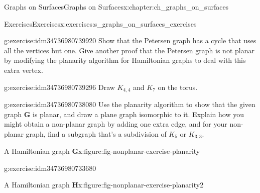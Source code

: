 \documentclass[oneside,10pt,]{book}
\numberwithin{equation}{section}
\newcommand{\bfG}{\mathbf{G}}
\newcommand{\bfH}{\mathbf{H}}
\begin{document}
\begin{chapterptx}{Graphs on Surfaces}{}{Graphs on Surfaces}{}{}{x:chapter:ch_graphs_on_surfaces}
\typeout{************************************************}
%
\begin{exercises-section}{Exercises}{}{Exercises}{}{}{x:exercises:s_graphs_on_surfaces_exercises}
\begin{divisionexercise}{1}{}{}{g:exercise:idm34736980739920}%
Show that the Petersen graph has a cycle that uses all the vertices but one.  Give another proof that the Petersen graph is not planar by modifying the planarity algorithm for Hamiltonian graphs to deal with this extra vertex.\end{divisionexercise}%
\begin{divisionexercise}{2}{}{}{g:exercise:idm34736980739296}%
Draw \(K_{4,4}\) and \(K_7\) on the torus.\end{divisionexercise}%
\begin{divisionexercise}{3}{}{}{g:exercise:idm34736980738080}%
Use the planarity algorithm to show that the given graph \(\bfG\) is planar, and draw a plane graph isomorphic to it.  Explain how you might obtain a non-planar graph by adding one extra edge, and for your non-planar graph, find a subgraph that's a subdivision of \(K_5\) or \(K_{3,3}\). \begin{figureptx}{A Hamiltonian graph \(\bfG\)}{x:figure:fig-nonplanar-exercise-planarity}{}%
\begin{image}{0.15}{0.7}{0.15}%
%
\end{image}%
\tcblower
\end{figureptx}%
\end{divisionexercise}%
\begin{divisionexercise}{4}{}{}{g:exercise:idm34736980733680}%
\begin{figureptx}{A Hamiltonian graph \(\bfH\)}{x:figure:fig-nonplanar-exercise-planarity2}{}%
\begin{image}{0.15}{0.7}{0.15}%
\end{image}
\end{figureptx}
\end{divisionexercise}
\end{exercises-section}
\end{chapterptx}
\end{document}
